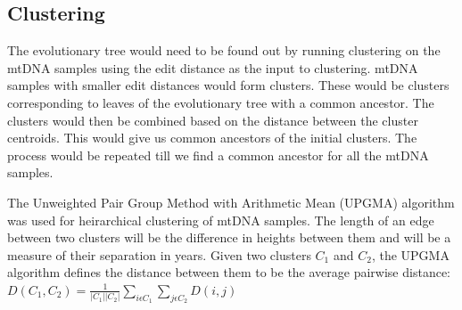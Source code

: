 \documentclass[conference]{IEEEtran}
\begin{document}
\FloatBarrier
\subsection{Clustering}
The evolutionary tree would need to be found out by running clustering on the mtDNA samples using the edit distance as the input to clustering. mtDNA samples with smaller edit distances would form clusters. These would be clusters corresponding to leaves of the evolutionary tree with a common ancestor. The clusters would then be combined based on the distance between the cluster centroids. This would give us common ancestors of the initial clusters. The process would be repeated till we find a common ancestor for all the mtDNA samples. 

The Unweighted Pair Group Method with Arithmetic Mean (UPGMA) algorithm \cite{TextBook1} was used for heirarchical clustering of mtDNA samples. The length of an edge between two clusters will be the difference in heights between them and will be a measure of their separation in years. Given two clusters $C_1$ and $C_2$, the UPGMA algorithm defines the distance between them to be the average pairwise distance: \\

$D(C_1, C_2) =\frac{1}{\left | C_1 \right | \left | C_2 \right |} \sum_{i \epsilon C_1} \sum_{j \epsilon C_2} D\left (i, j \right )$\\
\end{document}
